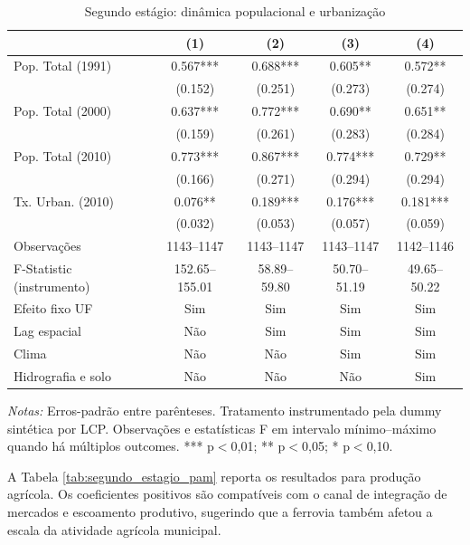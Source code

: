 \documentclass[12pt,a4paper]{article}
\begin{document}
\begin{table}[!htbp]
\centering
\scriptsize
\setlength{\tabcolsep}{3.5pt}
\renewcommand{\arraystretch}{0.80}
\caption{Segundo estágio: dinâmica populacional e urbanização}
\label{tab:segundo_estagio_pop}
\begin{tabular}{lcccc}
\toprule
& (1) & (2) & (3) & (4) \\
\midrule
Pop. Total (1991) & \num{0.567}*** & \num{0.688}*** & \num{0.605}** & \num{0.572}** \\
& (\num{0.152}) & (\num{0.251}) & (\num{0.273}) & (\num{0.274}) \\
Pop. Total (2000) & \num{0.637}*** & \num{0.772}*** & \num{0.690}** & \num{0.651}** \\
& (\num{0.159}) & (\num{0.261}) & (\num{0.283}) & (\num{0.284}) \\
Pop. Total (2010) & \num{0.773}*** & \num{0.867}*** & \num{0.774}*** & \num{0.729}** \\
& (\num{0.166}) & (\num{0.271}) & (\num{0.294}) & (\num{0.294}) \\
Tx. Urban. (2010) & \num{0.076}** & \num{0.189}*** & \num{0.176}*** & \num{0.181}*** \\
& (\num{0.032}) & (\num{0.053}) & (\num{0.057}) & (\num{0.059}) \\
\midrule
Observações & 1143--1147 & 1143--1147 & 1143--1147 & 1142--1146 \\
F-Statistic (instrumento) & 152.65--155.01 & 58.89--59.80 & 50.70--51.19 & 49.65--50.22 \\
Efeito fixo UF & Sim & Sim & Sim & Sim \\
Lag espacial & Não & Sim & Sim & Sim \\
Clima & Não & Não & Sim & Sim \\
Hidrografia e solo & Não & Não & Não & Sim \\
\bottomrule
\end{tabular}
\begin{minipage}{0.95\textwidth}
\scriptsize \textit{Notas:} Erros-padrão entre parênteses. Tratamento instrumentado pela dummy sintética por LCP. Observações e estatísticas F em intervalo mínimo--máximo quando há múltiplos outcomes. *** p$<$0,01; ** p$<$0,05; * p$<$0,10.
\end{minipage}
\end{table}


A Tabela \ref{tab:segundo_estagio_pam} reporta os resultados para produção agrícola. Os coeficientes positivos são compatíveis com o canal de integração de mercados e escoamento produtivo, sugerindo que a ferrovia também afetou a escala da atividade agrícola municipal.
\end{document}
